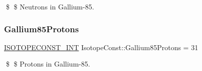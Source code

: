 \$ \$ Neutrons in Gallium-\/85. \mbox{\label{group___isotope_const-_gallium-_ga85_ga7b1c8be49f7f2b7b3d3a549d4afe1f25}} 
\subsubsection{\texorpdfstring{Gallium85\+Protons}{Gallium85Protons}}
{\footnotesize\ttfamily \mbox{\hyperlink{group___isotope_const-_macros_ga5f18360b3e99483a35c32d789e62621c}{I\+S\+O\+T\+O\+P\+E\+C\+O\+N\+S\+T\+\_\+\+I\+NT}} Isotope\+Const\+::\+Gallium85\+Protons = 31}

\$ \$ Protons in Gallium-\/85. 
